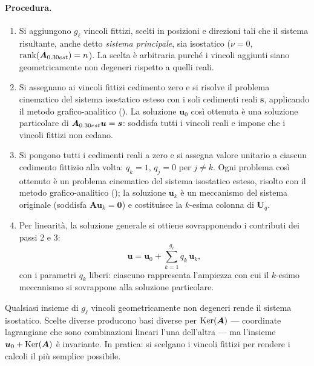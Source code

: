 \paragraph{Procedura.}
\begin{enumerate}[label=(\arabic*),
	leftmargin=*, itemsep=4pt]
	
	\item Si aggiungono $g_\ell$ vincoli fittizi, scelti
	in posizioni e direzioni tali che il sistema
	risultante, anche detto \textit{sistema principale},  sia isostatico ($\nu = 0$,
	$\operatorname{rank}(\bm{A}_{0.30 est}) = n$). La scelta è
	arbitraria purché i vincoli aggiunti siano
	geometricamente non degeneri rispetto a quelli
	reali.
	
	\item Si assegnano ai vincoli fittizi cedimento zero
	e si risolve il problema cinematico del sistema
	isostatico esteso con i soli cedimenti reali
	$\bm{s}$, applicando il metodo
	grafico-analitico ().
	La soluzione $\bm{u}_0$ così ottenuta
	è una soluzione particolare di
	$\bm{A}_{0.30 est}\bm{u} = \bm{s}$: soddisfa tutti i
	vincoli reali e impone che i vincoli fittizi
	non cedano.
	
	\item Si pongono tutti i cedimenti reali a zero e si
	assegna valore unitario a ciascun cedimento
	fittizio alla volta: $q_k = 1$, $q_j = 0$ per
	$j \neq k$. Ogni problema così ottenuto è un
	problema cinematico del sistema isostatico esteso,
	risolto con il metodo grafico-analitico
	(); la soluzione
	$\bm{u}_k$ è un meccanismo del sistema originale
	(soddisfa $\bm{A}\bm{u}_k = \bm{0}$) e
	costituisce la $k$-esima colonna di $\bm{U}_q$.
	
	\item Per linearità, la soluzione generale si ottiene
	sovrapponendo i contributi dei passi 2 e 3:
	\begin{equation}
		\bm{u} = \bm{u}_0 +
		\sum_{k=1}^{g_\ell} q_k\,\bm{u}_k,
	\end{equation}
	con i parametri $q_k$ liberi: ciascuno
	rappresenta l'ampiezza con cui il $k$-esimo
	meccanismo si sovrappone alla soluzione
	particolare.
	
\end{enumerate}


\begin{oss}
	Qualsiasi insieme di $g_\ell$ vincoli geometricamente
	non degeneri rende il sistema isostatico. Scelte
	diverse producono basi diverse per $\operatorname{Ker}(\bm{A})$
	--- coordinate lagrangiane che sono combinazioni
	lineari l'una dell'altra --- ma l'insieme
	$\bm{u}_0 + \operatorname{Ker}(\bm{A})$ è invariante.
	In pratica: si scelgano i vincoli fittizi per rendere
	i calcoli il più
	semplice possibile.
\end{oss}



